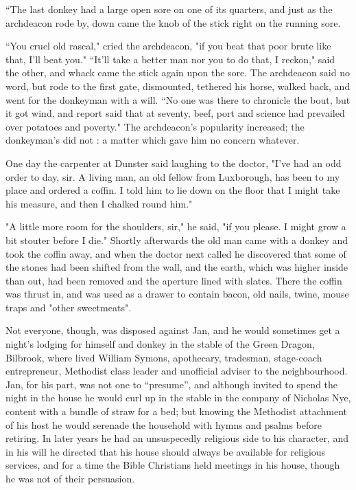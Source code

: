 “The last donkey had a large open sore on one of its quarters, and just as the archdeacon rode by, down came the knob of the stick right on the running sore.

“You cruel old rascal," cried the archdeacon, "if you beat that poor brute like that, I’ll beat you."
“It'll take a better man nor you to do that, I reckon," said the other, and whack came the stick again upon the sore. The archdeacon said no word, but rode to the first gate, dismounted, tethered his horse, walked back, and went for the donkeyman with a will.
“No one was there to chronicle the bout, but it got wind, and report said that at seventy, beef, port and science had prevailed over potatoes and poverty." The archdeacon's popularity increased; the donkeyman's did not : a matter which gave him no concern whatever.

One day the carpenter at Dunster said laughing to the doctor, "I've had an odd order to day, sir. A living man, an old fellow from Luxborough, has been to my place and ordered a coffin. I told him to lie down on the floor that I might take his measure, and then I chalked round him."

"A little more room for the shoulders, sir," he said, "if you please. I might grow a bit stouter before I die."
 Shortly afterwards the old man came with a donkey and took the coffin away, and when the doctor next called he discovered that some of the stones had been shifted from the wall, and the earth, which was higher inside than out, had been removed and the aperture lined with slates. There the coffin was thrust in, and was used as a drawer to contain bacon, old nails, twine, mouse traps and "other sweetmeats".

Not everyone, though, was disposed against Jan, and he would sometimes get a night's lodging for himself and donkey in the stable of the Green Dragon, Bilbrook, where lived William Symons, apothecary, tradesman, stage-coach entrepreneur, Methodist class leader and unofficial adviser to the neighbourhood. Jan, for his part, was not one to “presume”, and although invited to spend the night in the house he would curl up in the stable in the company of Nicholas Nye, content with a bundle of straw for a bed; but knowing the Methodist attachment of his host he would serenade the household with hymns and psalms before retiring. In later years he had an unsuspecedly religious side to his character, and in his will he directed that his house should always be available for religious services, and for a time the Bible Christians held meetings in his house, though he was not of their persuasion.

